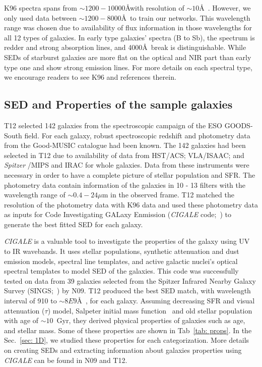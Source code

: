\documentclass[useAMS,usenatbib]{mn2e}
\newcommand \Spitzer {{\it Spitzer }}
\begin{document}
    K96 spectra spans from $\sim1200-10000$\AA with resolution of $\sim 10$\AA~.
    However, we only used data between $\sim1200-8000$\AA~to train our networks. 
    This wavelength range was chosen due to availability of flux information in those wavelengths for all 12 types of galaxies.
    In early type galaxies' spectra (B to Sb), the spectrum is redder and strong absorption lines, and 4000\AA~break is distinguishable. 
    While SEDs of starburst galaxies are more flat on the optical and NIR part than early type one and show strong emission lines.
    For more details on each spectral type, we encourage readers to see K96 and references therein. 
    

 \subsection{SED and Properties of the sample galaxies} 
    T12 selected 142 galaxies from the spectroscopic campaign of the ESO GOODS-South field.
    For each galaxy, robust spectroscopic redshift and photometry data from the Good-MUSIC catalogue had been known.
    The 142 galaxies had been selected in T12 due to availability of data from HST/ACS; VLA/ISAAC; and \Spitzer/MIPS and IRAC for whole galaxies. 
    Data from these instruments were necessary in order to have a complete picture of stellar population and SFR.
    The photometry data contain information of the galaxies in 10 - 13 filters with the wavelength range of $\sim 0.4-24 \mu$m in the observed frame.
    T12 matched the resolution of the photometry data with K96 data and used these photometry data as inputs for Code Investigating GALaxy Enmission ({\em CIGALE} code;~\citep[][hereafter N09]{Noll09}) to generate the best fitted SED for each galaxy.%
    
    {\em CIGALE} is a valuable tool to investigate the properties of the galaxy using UV to IR wavebands.
    It uses stellar populations, synthetic attenuation and dust emission models, spectral line templates, and active galactic nuclei's optical spectral templates to model SED of the galaxies.
    This code was successfully tested on data from 39 galaxies selected from the Spitzer Infrared Nearby Galaxy Survey (SINGS;~\citep{Kennicutt03}) by N09.
    T12 produced the best SED match, with wavelength interval of 910 to $\sim 8E9$\AA~, for each galaxy.
    Assuming decreasing SFR and visual attenuation ($\tau$) model, Salpeter initial mass function~\citep{Salpeter55} and old stellar population with age of $\sim 10$~Gyr, they derived physical properties of galaxies such as age, and stellar mass.
    Some of these properties are shown in Tab~\ref{tab: props}.
    In the Sec.~\ref{sec: 1D}, we studied these properties for each categorization.
    More details on creating SEDs and extracting information about galaxies properties using {\em CIGALE} can be found in N09 and T12.
    
\end{document}
